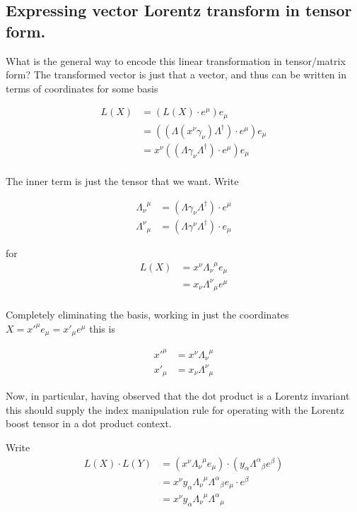 \documentclass{article}
\begin{document}
\subsection{ Expressing vector Lorentz transform in tensor form. }

What is the general way to encode this linear transformation in tensor/matrix form?  The transformed vector is just that a vector, and thus can be written in terms of 
coordinates for some basis

\begin{align*}
L(X) 
&= (L(X) \cdot e^\mu) e_\mu \\
&= ((\Lambda (x^\nu \gamma_\nu) \Lambda^\dagger) \cdot e^\mu) e_\mu \\
&= x^\nu ((\Lambda \gamma_\nu \Lambda^\dagger) \cdot e^\mu) e_\mu \\
\end{align*}

The inner term is just the tensor that we want.  Write

\begin{align*}
{\Lambda_{\nu}}^{\mu} &= (\Lambda \gamma_\nu \Lambda^\dagger) \cdot e^\mu \\
{\Lambda^{\nu}}_{\mu} &= (\Lambda \gamma^\nu \Lambda^\dagger) \cdot e_\mu
\end{align*}

for 
\begin{align*}
L(X) &= x^\nu {\Lambda_{\nu}}^{\mu} e_\mu \\
     &= x_\nu {\Lambda^{\nu}}_{\mu} e^\mu \\
\end{align*}

Completely eliminating the basis, working in just the coordinates $X = {x'}^\mu e_\mu = {x'}_\mu e^\mu$ this is

\begin{align}
{x'}^\mu &= x^\nu {\Lambda_{\nu}}^{\mu} \\
{x'}_\mu &= x_\nu {\Lambda^{\nu}}_{\mu}
\end{align}

Now, in particular, having observed that the dot product is a Lorentz invariant this should supply the index manipulation rule for operating
with the Lorentz boost tensor in a dot product context.

Write
\begin{align*}
L(X) \cdot L(Y)
&= (x^\nu {\Lambda_{\nu}}^{\mu} e_\mu) \cdot (y_\alpha {\Lambda^{\alpha}}_{\beta} e^\beta) \\
&= x^\nu y_\alpha {\Lambda_{\nu}}^{\mu} {\Lambda^{\alpha}}_{\beta} e_\mu \cdot e^\beta \\
&= x^\nu y_\alpha {\Lambda_{\nu}}^{\mu} {\Lambda^{\alpha}}_{\mu} \\
\end{align*}
\end{document}
